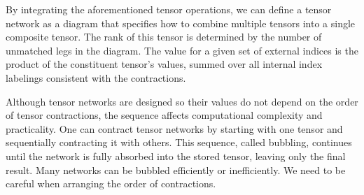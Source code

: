 \documentclass[12pt,dvipdfmx,twoside,openright]{report}
\begin{document}
By integrating the aforementioned tensor operations, we can define a tensor network as a diagram that specifies how to combine multiple tensors into a single composite tensor.
The rank of this tensor is determined by the number of unmatched legs in the diagram.
The value for a given set of external indices is the product of the constituent tensor's values, summed over all internal index labelings consistent with the contractions.

Although tensor networks are designed so their values do not depend on the order of tensor contractions, the sequence affects computational complexity and practicality.
One can contract tensor networks by starting with one tensor and sequentially contracting it with others.
This sequence, called bubbling, continues until the network is fully absorbed into the stored tensor, leaving only the final result.
Many networks can be bubbled efficiently or inefficiently.
We need to be careful when arranging the order of contractions.
\end{document}
